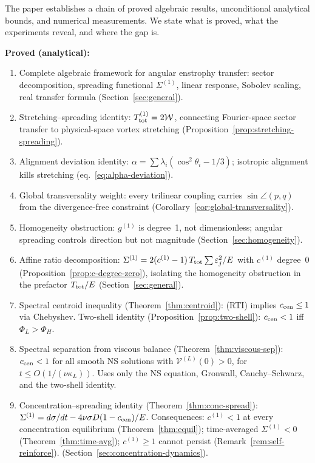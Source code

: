 \documentclass[11pt]{article}
\theoremstyle{definition}
\begin{document}
The paper establishes a chain of proved algebraic
results, unconditional analytical bounds, and
numerical measurements.  We state what is proved,
what the experiments reveal, and where the gap is.

\medskip\noindent\textbf{Proved (analytical):}
\begin{enumerate}[leftmargin=2em,label=\textbf{(\arabic*)}]
\item Complete algebraic framework for angular
  enstrophy transfer: sector decomposition,
  spreading functional $\Sigma^{(1)}$, linear
  response, Sobolev scaling, real transfer formula
  (Section~\ref{sec:general}).
\item Stretching--spreading identity:
  $T_{\rm tot}^{(1)}=2\mathcal{W}$, connecting
  Fourier-space sector transfer to physical-space
  vortex stretching
  (Proposition~\ref{prop:stretching-spreading}).
\item Alignment deviation identity:
  $\alpha=\sum\lambda_i(\cos^2\theta_i-1/3)$;
  isotropic alignment kills stretching
  (eq.~\eqref{eq:alpha-deviation}).
\item Global transversality weight: every trilinear
  coupling carries $\sin\angle(p,q)$ from the
  divergence-free constraint
  (Corollary~\ref{cor:global-transversality}).
\item Homogeneity obstruction: $g^{(1)}$ is degree~1,
  not dimensionless; angular spreading controls
  direction but not magnitude
  (Section~\ref{sec:homogeneity}).
\item Affine ratio decomposition:
  $\Sigma^{(1)}=2(c^{(1)}-1)\,T_{\rm tot}
  \sum\varepsilon_j^2/E$ with $c^{(1)}$ degree~0
  (Proposition~\ref{prop:c-degree-zero}), isolating
  the homogeneity obstruction in the prefactor
  $T_{\rm tot}/E$ (Section~\ref{sec:general}).
\item Spectral centroid inequality
  (Theorem~\ref{thm:centroid}): (RTI) implies
  $c_{\rm cen}\leq 1$ via Chebyshev.  Two-shell
  identity (Proposition~\ref{prop:two-shell}):
  $c_{\rm cen}<1$ iff $\Phi_L>\Phi_H$.
\item Spectral separation from viscous balance
  (Theorem~\ref{thm:viscous-sep}): $c_{\rm cen}<1$
  for all smooth NS solutions with
  $\mathcal{V}^{(L)}(0)>0$, for
  $t\leq O(1/(\nu\kappa_L))$.  Uses only the NS
  equation, Gronwall, Cauchy--Schwarz, and the
  two-shell identity.
\item Concentration--spreading identity
  (Theorem~\ref{thm:conc-spread}):
  $\Sigma^{(1)} = d\sigma/dt
  - 4\nu\sigma D(1-c_{\rm cen})/E$.
  Consequences:
  $c^{(1)}<1$ at every concentration equilibrium
  (Theorem~\ref{thm:equil});
  time-averaged $\Sigma^{(1)}<0$
  (Theorem~\ref{thm:time-avg});
  $c^{(1)}\geq 1$ cannot persist
  (Remark~\ref{rem:self-reinforce}).
  (Section~\ref{sec:concentration-dynamics}).
\end{enumerate}
\end{document}
